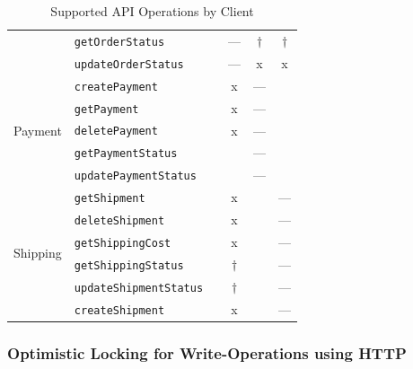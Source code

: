 \begin{table}[!htb]
\begin{tabular}{@{}llcccc@{}}
                                            & \texttt{getOrderStatus}               &           & ---       & $\dagger$ & $\dagger$ \\
                                            & \texttt{updateOrderStatus}            &           & ---       & x         & x \\
        \midrule
        \multirow{5}{*}{Payment}            & \texttt{createPayment}                &           & x         & ---       & \\
                                            & \texttt{getPayment}                   &           & x         & ---       & \\
                                            & \texttt{deletePayment}                &           & x         & ---       & \\
                                            & \texttt{getPaymentStatus}             &           &           & ---       & \\
                                            & \texttt{updatePaymentStatus}          &           &           & ---       & \\
        \midrule
        \multirow{6}{*}{Shipping}           & \texttt{getShipment}                  &           & x         &           & --- \\
                                            & \texttt{deleteShipment}               &           & x         &           & --- \\
                                            & \texttt{getShippingCost}              &           & x         &           & --- \\
                                            & \texttt{getShippingStatus}            &           & $\dagger$ &           & --- \\
                                            & \texttt{updateShipmentStatus}         &           & $\dagger$ &           & --- \\
                                            & \texttt{createShipment}               &           & x         &           & --- \\
        \bottomrule
    \end{tabular}
    \caption{Supported \acs{API} Operations by Client}\label{tab:ops}
\end{table}

\subsubsection{Optimistic Locking for Write-Operations using \acs{HTTP}}\label{sec:http-locking}

